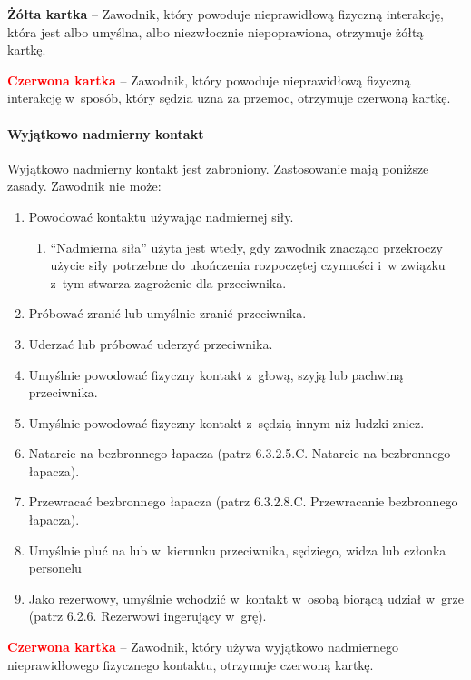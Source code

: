 \documentclass[12pt]{article}
\newcommand\redcard[1]{\bgroup\textcolor{red}{\textbf{#1}}}
\newcommand\yellowcard[1]{\bgroup\textcolor{darkyellow}{\textbf{#1}}}
\begin{document}
\yellowcard{Żółta kartka} -- Zawodnik, który powoduje nieprawidłową fizyczną
interakcję, która jest albo umyślna, albo niezwłocznie niepoprawiona,
otrzymuje żółtą kartkę.

\redcard{Czerwona kartka} -- Zawodnik, który powoduje nieprawidłową fizyczną
interakcję w~sposób, który sędzia uzna za przemoc, otrzymuje czerwoną
kartkę.

\paragraph{Wyjątkowo nadmierny kontakt}
Wyjątkowo nadmierny
kontakt jest zabroniony. Zastosowanie mają poniższe zasady. Zawodnik nie
może:

\begin{enumerate}
	\item
	      Powodować kontaktu używając nadmiernej siły.

	      \begin{enumerate}
		      \item
		            ``Nadmierna siła'' użyta jest wtedy, gdy zawodnik znacząco
		            przekroczy użycie siły potrzebne do ukończenia rozpoczętej czynności
		            i~w związku z~tym stwarza zagrożenie dla przeciwnika.
	      \end{enumerate}
	\item
	      Próbować zranić lub umyślnie zranić przeciwnika.
	\item
	      Uderzać lub próbować uderzyć przeciwnika.
	\item
	      Umyślnie powodować fizyczny kontakt z~głową, szyją lub pachwiną
	      przeciwnika.
	\item
	      Umyślnie powodować fizyczny kontakt z~sędzią innym niż ludzki znicz.
	\item
	      Natarcie na bezbronnego łapacza (patrz 6.3.2.5.C. Natarcie na
	      bezbronnego łapacza).
	\item
	      Przewracać bezbronnego łapacza (patrz 6.3.2.8.C. Przewracanie
	      bezbronnego łapacza).
	\item
	      Umyślnie pluć na lub w~kierunku przeciwnika, sędziego, widza lub
	      członka personelu
	\item
	      Jako rezerwowy, umyślnie wchodzić w~kontakt w~osobą biorącą udział w~grze (patrz 6.2.6. Rezerwowi ingerujący w~grę).
\end{enumerate}

\redcard{Czerwona kartka} -- Zawodnik, który używa wyjątkowo nadmiernego
nieprawidłowego fizycznego kontaktu, otrzymuje czerwoną kartkę.
\end{document}
